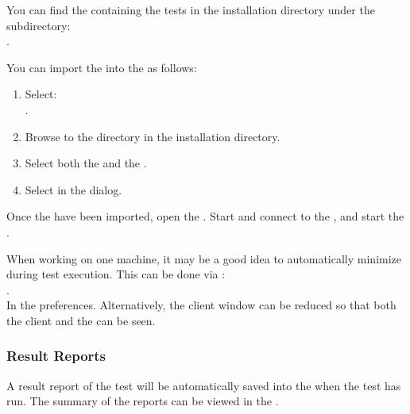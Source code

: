 You can find the \gdproject{} containing the tests
in the \app{} installation directory under the subdirectory:\\
. 

You can import the \gdproject{} into the \ite{} as follows:
\begin{enumerate}
\item Select:\\ .
\item Browse to the  directory in the \app{} installation directory. 
\item Select both the  \gdproject{} and the  \gdproject{}. 
\item  Select  in the  dialog. 
\end{enumerate}


Once the \gdprojects have been imported, open the  \gdproject{}. Start and connect to the \gdagent {}, and start the \gdaut{} . 


When working on one machine, it may be a good idea to automatically minimize 
\app{}during test execution. This can be done via :\\
. \\
In the  preferences. 
Alternatively, the client window can be reduced so 
that both the client and the \gdaut{} can be seen. 

\subsubsection{Result Reports}

A result report of the test will be automatically saved into the \gddb{} when the test has run. The summary of the reports can be viewed in the \gdtestsummaryview{} .
